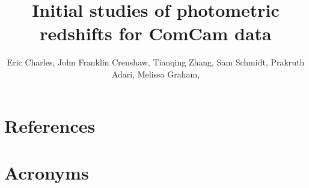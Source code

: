 \documentclass[SE,lsstdraft,authoryear,toc]{lsstdoc}
\title{Initial studies of photometric redshifts for ComCam data}
\author{%
  Eric Charles,
  John Franklin Crenshaw,
  Tianqing Zhang, 
  Sam Schmidt,
  Prakruth Adari, 
  Melissa Graham,  
}
\date{\vcsDate}
\begin{document}
\maketitle




\appendix




\section{References} \label{sec:bib}
\renewcommand{\refname}{} %


\section{Acronyms} \label{sec:acronyms}

\end{document}
